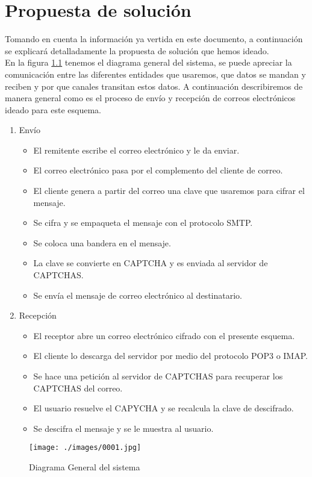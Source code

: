 \documentclass[12pt,oneside,onecolumn,openany]{report}
\begin{document}
\chapter{Propuesta de solución}
\clearpage
Tomando en cuenta la información ya vertida en este documento, a continuación se explicará detalladamente la propuesta de solución que hemos ideado.\\
En la figura \ref{fig:4-1-1} tenemos el diagrama general del sistema, se puede apreciar la comunicación entre las diferentes entidades que usaremos, que datos se mandan y reciben y por que canales transitan estos datos. A continuación describiremos de manera general como es el proceso de envío y recepción de correos electrónicos ideado para este esquema.\\
\begin{enumerate}
 \item {Envío}
\begin{itemize}
\item El remitente escribe el correo electrónico y le da enviar.\\
\item El correo electrónico pasa por el complemento del cliente de correo.\\
\item El cliente genera a partir del correo una clave que usaremos para cifrar el mensaje.\\
\item Se cifra y se empaqueta el mensaje con el protocolo SMTP.\\
\item Se coloca una bandera en el mensaje.\\
\item La clave se convierte en CAPTCHA y es enviada al servidor de CAPTCHAS.\\
\item Se envía el mensaje de correo electrónico al destinatario.\\
\end{itemize}

\item{Recepción}
\begin{itemize}
\item El receptor abre un correo electrónico cifrado con el presente esquema.\\
\item El cliente lo descarga del servidor por medio del protocolo POP3 o IMAP.\\
\item Se hace una petición al servidor de CAPTCHAS para recuperar los CAPTCHAS del correo.\\
\item El usuario resuelve el CAPYCHA y se recalcula la clave de descifrado.\\
\item Se descifra el mensaje y se le muestra al usuario.\\
\end{itemize}
\end{enumerate}
\begin{figure}[h]
	\texttt{[image: ./images/0001.jpg]}
	\caption{Diagrama General del sistema}
	\label{fig:4-1-1}
\end{figure}
\end{document}
